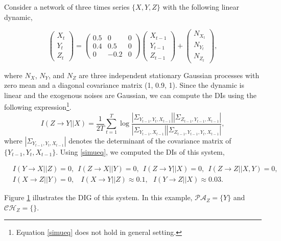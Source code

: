 \begin{example}\label{r1}
Consider a network of three times series $\{X,Y,Z\}$ with the following linear dynamic,
\begin{small}
\begin{equation}\label{model1}
\begin{pmatrix}
X_t \\
Y_t\\
Z_t
\end{pmatrix}=\begin{pmatrix}
0.5 & 0& 0\\
0.4 & 0.5 & 0\\
0 & -0.2 & 0
\end{pmatrix}\begin{pmatrix}
X_{t-1} \\
Y_{t-1}\\
Z_{t-1}
\end{pmatrix}+\begin{pmatrix}
N_{X_t} \\
N_{Y_t}\\
N_{Z_t}
\end{pmatrix},
\end{equation}
\end{small}
where $N_X$, $N_Y$, and $N_Z$ are three independent stationary Gaussian processes with zero mean and a diagonal covariance matrix (1, 0.9, 1). 
Since the dynamic is linear and the exogenous noises are Gaussian, we can compute the DIs using the following expression\footnote{Equation \eqref{simueq} does not hold in general setting.}\citet{acc2014}.
\begin{equation}\label{simueq}
I(Z\rightarrow Y||X)=\frac{1}{2T}\sum_{t=1}^{T}\log\frac{|\Sigma_{Y_{t-1},Y_{t},X_{t-1}}||\Sigma_{Z_{t-1},Y_{t-1},X_{t-1}}|}{|\Sigma_{Y_{t-1},X_{t-1}}||\Sigma_{Z_{t-1},Y_{t-1},Y_{t},X_{t-1}}|},
\end{equation}
where $|\Sigma_{Y_{t-1},Y_{t},X_{t-1}}|$ denotes the determinant of the covariance matrix of $\{Y_{t-1},Y_{t},X_{t-1}\}$. Using \eqref{simueq}, we computed the DIs of this system,
\begin{figure}
\hspace{4cm}
\label{fig:example_dig}
\end{figure}
\begin{small}
\begin{align*}
&I(Y\rightarrow X||Z)=0,\ \ I(Z\rightarrow X||Y)=0,\ \ I(Z\rightarrow Y||X)=0,\ \ I(Z\rightarrow Z||X,Y)=0,\\
&I(X\rightarrow Z||Y)=0,\ \ \ \ I(X\rightarrow Y||Z)\approx 0.1, \ \ \ I(Y\rightarrow Z||X)\approx 0.03.
\end{align*}
\end{small}
Figure \ref{fig:example_dig} illustrates the DIG of this system. In this example, $\mathcal{PA}_Z=\{Y\}$ and $\mathcal{CH}_Z=\{\}$.
\end{example}


